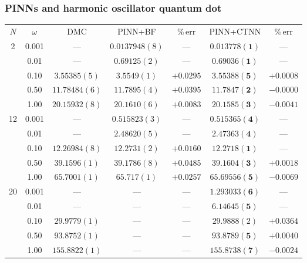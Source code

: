\documentclass{beamer}
\begin{document}
\begin{frame}
\frametitle{PINNs and harmonic oscillator quantum dot}

\footnotesize{
  \centering
    \begin{tabular}{c|c|c|cc|cc}
      $N$ & $\omega$ & DMC & PINN+BF & \%\,err & PINN+CTNN & \%\,err \\
      2 & 0.001 & --- & $0.0137948(8)$ & --- & $\mathbf{0.013778(1)}$ & --- \\
    & 0.01 & ---            & $0.69125(2)$  & --- & $\mathbf{0.69036(1)}$ & --- \\
    & 0.10 & $3.55385(5)$   & $3.5549(1)$   & $+0.0295$ & $\mathbf{3.55388(5)}$ & $+0.0008$ \\
    & 0.50 & $11.78484(6)$  & $11.7895(4)$  & $+0.0395$  & $\mathbf{11.7847(2)}$ & $-0.0000$ \\
    & 1.00 & $20.15932(8)$  & $20.1610(6)$  & $+0.0083$  & $\mathbf{20.1585(3)}$ & $-0.0041$ \\
    12 & 0.001 & ---          & $0.515823(3)$ & --- & $\mathbf{0.515365(4)}$ & --- \\
    & 0.01 & ---           & $2.48620(5)$  & --- & $\mathbf{2.47363(4)}$ & --- \\
    & 0.10 & $12.26984(8)$ & $12.2731(2)$  & $+0.0160$ & $\mathbf{12.2718(1)}$ & --- \\
    & 0.50 & $39.1596(1)$  & $39.1786(8)$  & $+0.0485$ & $\mathbf{39.1604(3)}$ & $+0.0018$ \\
    & 1.00 & $65.7001(1)$  & $65.717(1)$   & $+0.0257$ & $\mathbf{65.69556(5)}$ & $-0.0069$ \\
    20 & 0.001 & ---          & --- & --- & $\mathbf{1.293033(6)}$ & --- \\
    & 0.01 & ---           & ---  & --- & $\mathbf{6.14645(5)}$ & --- \\
    & 0.10 & $29.9779(1)$ & ---  & --- & $29.9888(2)$ & $+0.0364$ \\
    & 0.50 & $93.8752(1)$  & ---  & --- & $\mathbf{93.8789(5)}$ & $+0.0040$ \\
    & 1.00 & $155.8822(1)$  & ---   & --- & $\mathbf{155.8738(7)}$ & $-0.0024$ \\
\end{tabular}
}

\end{frame}
\end{document}

